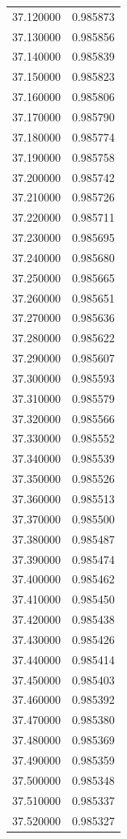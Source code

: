 \begin{tabular}{rr}
37.120000 & 0.985873 \\
37.130000 & 0.985856 \\
37.140000 & 0.985839 \\
37.150000 & 0.985823 \\
37.160000 & 0.985806 \\
37.170000 & 0.985790 \\
37.180000 & 0.985774 \\
37.190000 & 0.985758 \\
37.200000 & 0.985742 \\
37.210000 & 0.985726 \\
37.220000 & 0.985711 \\
37.230000 & 0.985695 \\
37.240000 & 0.985680 \\
37.250000 & 0.985665 \\
37.260000 & 0.985651 \\
37.270000 & 0.985636 \\
37.280000 & 0.985622 \\
37.290000 & 0.985607 \\
37.300000 & 0.985593 \\
37.310000 & 0.985579 \\
37.320000 & 0.985566 \\
37.330000 & 0.985552 \\
37.340000 & 0.985539 \\
37.350000 & 0.985526 \\
37.360000 & 0.985513 \\
37.370000 & 0.985500 \\
37.380000 & 0.985487 \\
37.390000 & 0.985474 \\
37.400000 & 0.985462 \\
37.410000 & 0.985450 \\
37.420000 & 0.985438 \\
37.430000 & 0.985426 \\
37.440000 & 0.985414 \\
37.450000 & 0.985403 \\
37.460000 & 0.985392 \\
37.470000 & 0.985380 \\
37.480000 & 0.985369 \\
37.490000 & 0.985359 \\
37.500000 & 0.985348 \\
37.510000 & 0.985337 \\
37.520000 & 0.985327 \\

\end{tabular}

